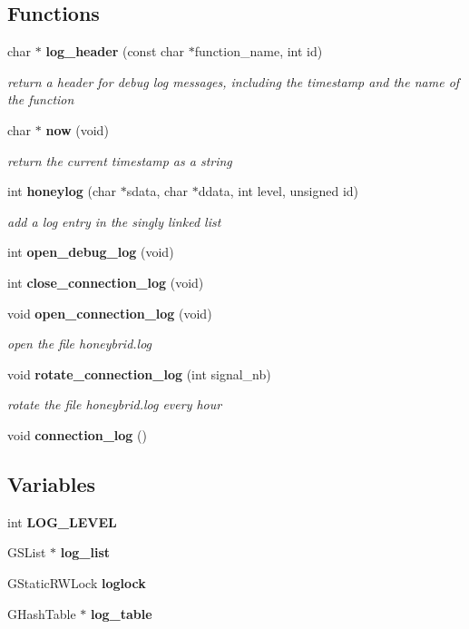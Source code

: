 \subsection*{Functions}
\begin{CompactItemize}
\item 
char $\ast$ {\bf log\_\-header} (const char $\ast$function\_\-name, int id)
\begin{CompactList}\small\item\em return a header for debug log messages, including the timestamp and the name of the function \item\end{CompactList}\item 
char $\ast$ {\bf now} (void)
\begin{CompactList}\small\item\em return the current timestamp as a string \item\end{CompactList}\item 
int {\bf honeylog} (char $\ast$sdata, char $\ast$ddata, int level, unsigned id)
\begin{CompactList}\small\item\em add a log entry in the singly linked list \item\end{CompactList}\item 
int {\bf open\_\-debug\_\-log} (void)
\item 
int {\bf close\_\-connection\_\-log} (void)
\item 
void {\bf open\_\-connection\_\-log} (void)
\begin{CompactList}\small\item\em open the file honeybrid.log \item\end{CompactList}\item 
void {\bf rotate\_\-connection\_\-log} (int signal\_\-nb)
\begin{CompactList}\small\item\em rotate the file honeybrid.log every hour \item\end{CompactList}\item 
void {\bf connection\_\-log} ()
\end{CompactItemize}
\subsection*{Variables}
\begin{CompactItemize}
\item 
int {\bf LOG\_\-LEVEL}
\item 
GSList $\ast$ {\bf log\_\-list}
\item 
GStaticRWLock {\bf loglock}
\item 
GHashTable $\ast$ {\bf log\_\-table}
\end{CompactItemize}


